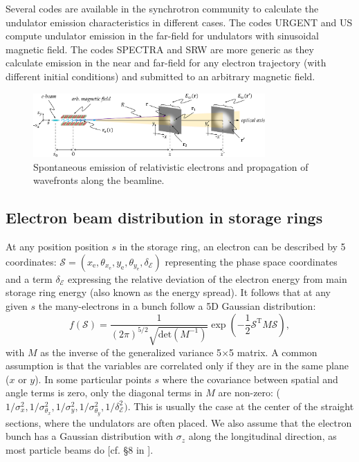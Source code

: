 \documentclass{iucr}              %
\begin{document}
Several codes are available in the synchrotron community to calculate the undulator emission characteristics in different cases. The codes URGENT \cite{codeURGENT} and US \cite{codeUS} compute undulator emission in the far-field for undulators with sinusoidal magnetic field. The codes SPECTRA \cite{Tanaka2001} and SRW \cite{codeSRW} are more generic as they calculate emission in the near and far-field for any electron trajectory (with different initial conditions) and submitted to an arbitrary magnetic field.

\onecolumn
\begin{figure}\label{fig:coordinates}
    \centering
    \includegraphics[width=0.79\textwidth]{coordinates.pdf}
    \caption{Spontaneous emission of relativistic electrons and propagation of wavefronts along the beamline.}
\end{figure}
\twocolumn

\subsection{Electron beam distribution in storage rings}
\label{sec:electronbeam}

At any position position $s$ in the storage ring, an electron can be described by 5 coordinates:
$\mathcal{S}= (x_\text{e},\theta_{x_\text{e}},y_\text{e},   \theta_{y_\text{e}},\delta_\mathcal{E})$ representing the phase space coordinates and a term $\delta_\mathcal{E}$ expressing the relative deviation of the electron energy from main storage ring energy (also known as the energy spread). It follows that at any given $s$ the many-electrons in a bunch follow a 5D Gaussian distribution:
\begin{equation}\label{eq:f-electrons}
f(\mathcal{S}) = \frac{1}{(2 \pi)^{5/2} \sqrt{\text{det}(M^{-1})}} \exp
        \left( -\frac{1}{2} \mathcal{S}^\text{T} M \mathcal{S} \right),
\end{equation}
with $M$ as the inverse of the generalized variance 5$\times$5 matrix. A common assumption is that the variables are correlated only if they are in the same plane ($x$ or $y$). In some particular points $s$ where the covariance between spatial and angle terms is zero, only the diagonal terms in $M$ are non-zero: ($1/\sigma_x^2,1/\sigma_{\theta_x}^2,1/\sigma_y^2,1/\sigma_{\theta_y}^2,1/\delta_\mathcal{E}^2)$. This is usually the case at the center of the straight sections, where the undulators are often placed.  We also assume that the electron bunch has a Gaussian distribution with $\sigma_z$ along the longitudinal direction, as most particle beams do [cf. \S8 in \cite{Wiedemann2015}].
 
\end{document}
